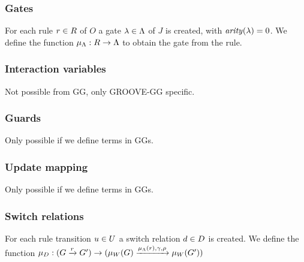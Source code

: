 \subsubsection{Gates}
For each rule $r \in R$ of $O$ a gate $\lambda \in \Lambda$ of $J$ is created, with $\mathit{arity}(\lambda) = 0$. We define the function $\mu_\Lambda: R \rightarrow \Lambda$ to obtain the gate from the rule.

\subsubsection{Interaction variables}
Not possible from GG, only GROOVE-GG specific.

\subsubsection{Guards}
Only possible if we define terms in GGs.

\subsubsection{Update mapping}
Only possible if we define terms in GGs.

\subsubsection{Switch relations}
For each rule transition $u \in U$ a switch relation $d \in D$ is created. We define the function $\mu_D: (G \xrightarrow{r} G') \rightarrow (\mu_W(G)\xrightarrow{\mu_\Lambda(r), \gamma, \rho}\mu_W(G'))$

